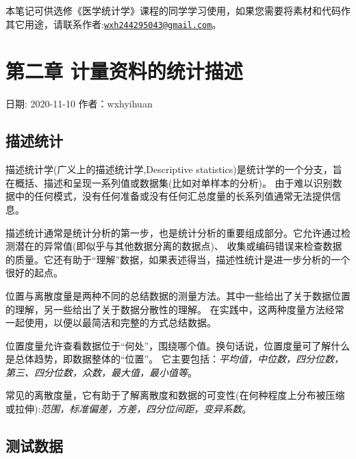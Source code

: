 \documentclass[
]{article}
\begin{document}
本笔记可供选修《医学统计学》课程的同学学习使用，如果您需要将素材和代码作其它用途，请联系作者:\href{mailto:wxh244295043@gmail.com}{\nolinkurl{wxh244295043@gmail.com}}。

\hypertarget{ux7b2cux4e8cux7ae0-ux8ba1ux91cfux8d44ux6599ux7684ux7edfux8ba1ux63cfux8ff0}{%
\section{第二章 计量资料的统计描述}\label{ux7b2cux4e8cux7ae0-ux8ba1ux91cfux8d44ux6599ux7684ux7edfux8ba1ux63cfux8ff0}}

日期: 2020-11-10
作者：wxhyihuan

\hypertarget{ux63cfux8ff0ux7edfux8ba1}{%
\subsection{描述统计}\label{ux63cfux8ff0ux7edfux8ba1}}

描述统计学(广义上的描述统计学,Descriptive statistics)是统计学的一个分支，旨在概括、描述和呈现一系列值或数据集(比如对单样本的分析)。
由于难以识别数据中的任何模式，没有任何准备或没有任何汇总度量的长系列值通常无法提供信息。

描述统计通常是统计分析的第一步，也是统计分析的重要组成部分。它允许通过检测潜在的异常值(即似乎与其他数据分离的数据点)、
收集或编码错误来检查数据的质量。它还有助于``理解''数据，如果表述得当，描述性统计是进一步分析的一个很好的起点。

位置与离散度量是两种不同的总结数据的测量方法。其中一些给出了关于数据位置的理解，另一些给出了关于数据分散性的理解。
在实践中，这两种度量方法经常一起使用，以便以最简洁和完整的方式总结数据。

位置度量允许查看数据位于``何处''，围绕哪个值。换句话说，位置度量可了解什么是总体趋势，即数据整体的``位置''。
它主要包括：\emph{平均值，中位数，四分位数，第三、四分位数，众数，最大值，最小值等}。

常见的离散度量，它有助于了解离散度和数据的可变性(在何种程度上分布被压缩或拉伸):\emph{范围，标准偏差，方差，四分位间距，变异系数}。

\hypertarget{ux6d4bux8bd5ux6570ux636e}{%
\subsection{测试数据}\label{ux6d4bux8bd5ux6570ux636e}}
\end{document}
